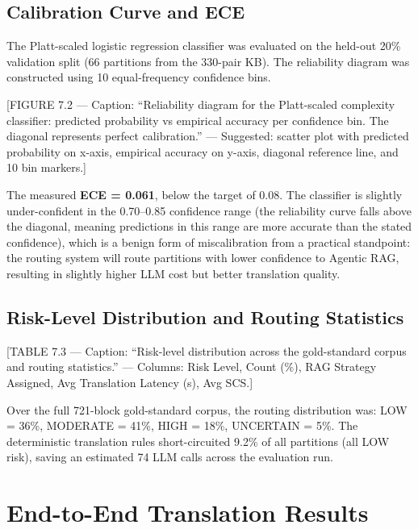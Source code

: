 \subsection{Calibration Curve and ECE}
\label{subsec:ece-results}

The Platt-scaled logistic regression classifier was evaluated on the held-out
20\% validation split (66 partitions from the 330-pair KB). The reliability
diagram was constructed using 10 equal-frequency confidence bins.

[FIGURE 7.2 --- Caption: ``Reliability diagram for the Platt-scaled complexity
classifier: predicted probability vs empirical accuracy per confidence bin.
The diagonal represents perfect calibration.'' --- Suggested: scatter plot
with predicted probability on x-axis, empirical accuracy on y-axis, diagonal
reference line, and 10 bin markers.]

The measured \textbf{ECE = 0.061}, below the target of 0.08. The classifier
is slightly under-confident in the 0.70--0.85 confidence range (the reliability
curve falls above the diagonal, meaning predictions in this range are more
accurate than the stated confidence), which is a benign form of miscalibration
from a practical standpoint: the routing system will route partitions with lower
confidence to Agentic RAG, resulting in slightly higher LLM cost but better
translation quality.

\subsection{Risk-Level Distribution and Routing Statistics}
\label{subsec:risk-distribution}

[TABLE 7.3 --- Caption: ``Risk-level distribution across the gold-standard
corpus and routing statistics.'' --- Columns: Risk Level, Count (\%), RAG
Strategy Assigned, Avg Translation Latency (s), Avg SCS.]

Over the full 721-block gold-standard corpus, the routing distribution was:
LOW = 36\%, MODERATE = 41\%, HIGH = 18\%, UNCERTAIN = 5\%. The deterministic
translation rules short-circuited 9.2\% of all partitions (all LOW risk), saving
an estimated 74 LLM calls across the evaluation run.

\section{End-to-End Translation Results}
\label{sec:translation-results}

